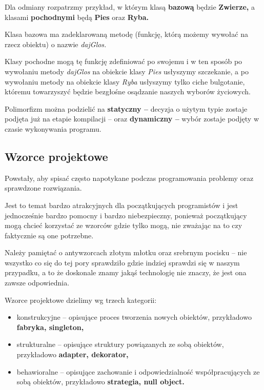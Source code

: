 Dla odmiany rozpatrzmy przykład, w którym klasą \textbf{bazową} będzie \textbf{Zwierze,} a klasami \textbf{pochodnymi} będą \textbf{Pies} oraz \textbf{Ryba.}

Klasa bazowa ma zadeklarowaną metodę (funkcję, którą możemy wywołać na rzecz obiektu) o nazwie \textit{dajGlos.}

Klasy pochodne mogą tę funkcję zdefiniować po swojemu i w ten sposób po wywołaniu metody \textit{dajGlos} na obiekcie klasy \textit{Pies} usłyszymy szczekanie, a po wywołaniu metody na obiekcie klasy \textit{Ryba} usłyszymy tylko ciche bulgotanie, któremu towarzyszyć będzie bezgłośne osądzanie naszych wyborów życiowych.

Polimorfizm można podzielić na \textbf{statyczny --} decyzja o użytym typie zostaje podjęta już na etapie kompilacji -- oraz \textbf{dynamiczny --} wybór zostaje podjęty w czasie wykonywania programu.

\subsection{Wzorce projektowe}
Powstały, aby spisać często napotykane podczas programowania problemy oraz sprawdzone rozwiązania.

Jest to temat bardzo atrakcyjnych dla początkujących programistów i jest jednocześnie bardzo pomocny i bardzo niebezpieczny, ponieważ początkujący mogą chcieć korzystać ze wzorców gdzie tylko mogą, nie zważając na to czy faktycznie są one potrzebne.

Należy pamiętać o antywzorcach złotym młotku oraz srebrnym pocisku -- nie wszystko co się do tej pory sprawdziło gdzie indziej sprawdzi się w naszym przypadku, a to że doskonale znamy jakąś technologię nie znaczy, że jest ona zawsze odpowiednia.

Wzorce projektowe dzielimy wg trzech kategorii:
\begin{itemize}
	\item{konstrukcyjne -- opisujące proces tworzenia nowych obiektów, przykładowo \textbf{fabryka, singleton,}}
	\item{strukturalne -- opisujące struktury powiązanych ze sobą obiektów, przykładowo \textbf{adapter, dekorator,}}
	\item{behawioralne -- opisujące zachowanie i odpowiedzialność współpracujących ze sobą obiektów, przykładowo \textbf{strategia, null object.}}
\end{itemize}






